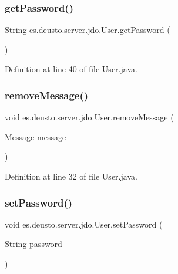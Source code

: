 \subsubsection{\texorpdfstring{getPassword()}{getPassword()}}
{\footnotesize\ttfamily String es.\+deusto.\+server.\+jdo.\+User.\+get\+Password (\begin{DoxyParamCaption}{ }\end{DoxyParamCaption})}



Definition at line 40 of file User.\+java.

\mbox{\label{classes_1_1deusto_1_1server_1_1jdo_1_1_user_af83c1484fccb51d9977e0be6b3552562}} 
\subsubsection{\texorpdfstring{removeMessage()}{removeMessage()}}
{\footnotesize\ttfamily void es.\+deusto.\+server.\+jdo.\+User.\+remove\+Message (\begin{DoxyParamCaption}\item[{\mbox{\hyperlink{classes_1_1deusto_1_1server_1_1jdo_1_1_message}{Message}}}]{message }\end{DoxyParamCaption})}



Definition at line 32 of file User.\+java.

\mbox{\label{classes_1_1deusto_1_1server_1_1jdo_1_1_user_a2e052b5a7cab949f61580edf44bbd233}} 
\subsubsection{\texorpdfstring{setPassword()}{setPassword()}}
{\footnotesize\ttfamily void es.\+deusto.\+server.\+jdo.\+User.\+set\+Password (\begin{DoxyParamCaption}\item[{String}]{password }\end{DoxyParamCaption})}



